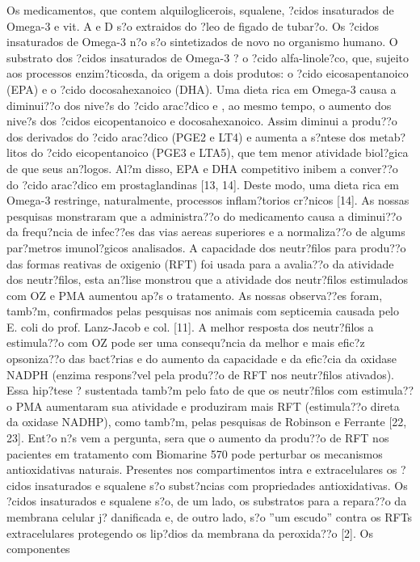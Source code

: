 \documentclass[12pt]{article}
\begin{document}
 Os medicamentos, que contem alquiloglicerois, squalene, ?cidos
insaturados de Omega-3 e vit. A e D s?o extraidos do ?leo de figado de
tubar?o. Os ?cidos insaturados de Omega-3 n?o s?o sintetizados de novo no
organismo humano. O substrato dos ?cidos insaturados de Omega-3 ? o ?cido
alfa-linole?co, que, sujeito aos processos enzim?ticosda, da origem a
dois produtos: o ?cido eicosapentanoico (EPA) e o ?cido docosahexanoico
(DHA). Uma dieta rica em Omega-3 causa a diminui??o dos nive?s do ?cido
arac?dico e , ao mesmo tempo, o aumento dos nive?s dos ?cidos
eicopentanoico e docosahexanoico. Assim diminui a produ??o dos derivados do
?cido arac?dico (PGE2 e LT4) e aumenta a s?ntese dos metab?litos do ?cido
eicopentanoico (PGE3 e LTA5), que tem menor atividade biol?gica de que
seus an?logos. Al?m disso, EPA e DHA competitivo inibem a conver??o do
?cido arac?dico em prostaglandinas [13, 14]. Deste modo, uma dieta rica
em Omega-3 restringe, naturalmente, processos inflam?torios cr?nicos
[14].
 As nossas pesquisas monstraram que a administra??o do medicamento
causa a diminui??o da frequ?ncia de infec??es das vias aereas superiores e
a normaliza??o de algums par?metros imunol?gicos analisados. A
capacidade dos neutr?filos para produ??o das formas reativas de oxigenio (RFT)
foi usada para a avalia??o da atividade dos neutr?filos, esta an?lise
monstrou que a atividade dos neutr?filos estimulados com OZ e PMA
aumentou ap?s o tratamento.  As nossas observa??es foram, tamb?m, confirmados
pelas pesquisas nos animais com septicemia causada pelo E. coli do
prof. Lanz-Jacob e col. [11].  A melhor resposta dos neutr?filos a
estimula??o com OZ pode ser uma consequ?ncia da melhor e mais efic?z
opsoniza??o das bact?rias e do aumento da capacidade e da efic?cia da oxidase
NADPH (enzima respons?vel pela produ??o de RFT nos neutr?filos ativados).
Essa hip?tese ? sustentada tamb?m pelo fato de que os neutr?filos com
estimula??o PMA aumentaram sua atividade e produziram mais RFT
(estimula??o direta da oxidase NADHP), como tamb?m, pelas pesquisas de Robinson
e Ferrante [22, 23]. Ent?o n?s vem a pergunta, sera que o aumento da
produ??o de RFT nos pacientes em tratamento com Biomarine 570 pode
perturbar os mecanismos antioxidativas naturais. Presentes nos compartimentos
intra e extracelulares os ?cidos insaturados e squalene s?o subst?ncias
com propriedades antioxidativas. Os ?cidos insaturados e squalene s?o,
de um lado, os substratos para a repara??o da membrana celular j?
danificada e, de outro lado, s?o ''um escudo'' contra os RFTs extracelulares
protegendo os lip?dios da membrana da peroxida??o [2]. Os componentes
\end{document}
